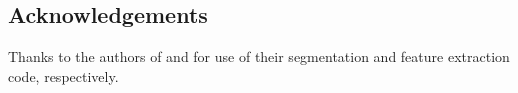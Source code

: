 \documentclass[10pt,twocolumn,letterpaper]{article}
\begin{document}
\subsection*{Acknowledgements}
Thanks to the authors of \cite{arbelaez09} and \cite{farhadi09} for use of their
segmentation and feature extraction code, respectively.

{\small
%


}
\end{document}
